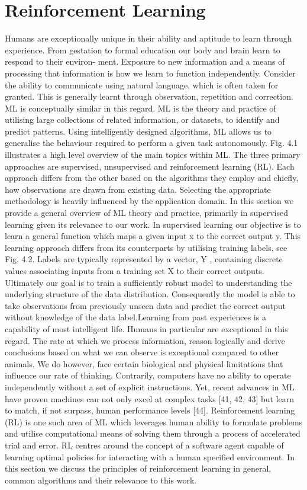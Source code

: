 \documentclass[runningheads]{llncs}
\begin{document}
\section{Reinforcement Learning}
Humans are exceptionally unique in their ability and aptitude to learn through experience.
From gestation to formal education our body and brain learn to respond to their environ-
ment. Exposure to new information and a means of processing that information is how
we learn to function independently. Consider the ability to communicate using natural
language, which is often taken for granted. This is generally learnt through observation,
repetition and correction. ML is conceptually similar in this regard. ML is the theory and
practice of utilising large collections of related information, or datasets, to identify and
predict patterns. Using intelligently designed algorithms, ML allows us to generalise the
behaviour required to perform a given task autonomously. Fig. 4.1 illustrates a high level
overview of the main topics within ML. The three primary approaches are supervised,
unsupervised and reinforcement learning (RL). Each approach differs from the other based
on the algorithms they employ and chiefly, how observations are drawn from existing data.
Selecting the appropriate methodology is heavily influenced by the application domain.
In this section we provide a general overview of ML theory and practice, primarily in
supervised learning given its relevance to our work. In supervised learning our objective is to learn a general function which maps a given
input x to the correct output y. This learning approach differs from its counterparts by
utilising training labels, see Fig. 4.2. Labels are typically represented by a vector, Y ,
containing discrete values associating inputs from a training set X to their correct outputs.
Ultimately our goal is to train a sufficiently robust model to understanding the underlying
structure of the data distribution. Consequently the model is able to take observations from
previously unseen data and predict the correct output without knowledge of the data label.Learning from past experiences is a capability of most intelligent life. Humans in particular
are exceptional in this regard. The rate at which we process information, reason logically
and derive conclusions based on what we can observe is exceptional compared to other
animals. We do however, face certain biological and physical limitations that influence our
rate of thinking. Contrarily, computers have no ability to operate independently without a
set of explicit instructions. Yet, recent advances in ML have proven machines can not only
excel at complex tasks [41, 42, 43] but learn to match, if not surpass, human performance
levels [44]. Reinforcement learning (RL) is one such area of ML which leverages human
ability to formulate problems and utilise computational means of solving them through a
process of accelerated trial and error. RL centres around the concept of a software agent
capable of learning optimal policies for interacting with a human specified environment.
In this section we discuss the principles of reinforcement learning in general, common
algorithms and their relevance to this work. 
\end{document}
